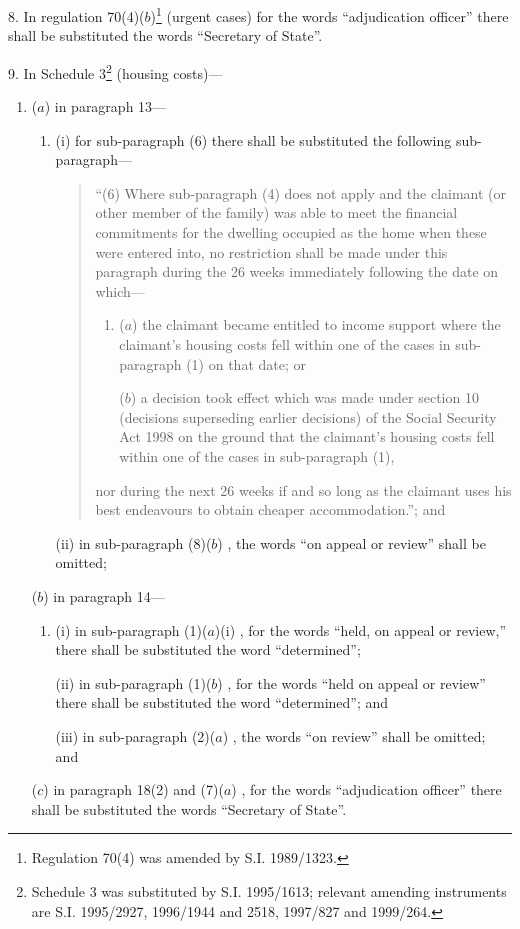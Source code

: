 \documentclass[12pt,a4paper]{article}
\begin{document}
\medskip

8.  In regulation 70(4)($b$)\footnote{\frenchspacing Regulation 70(4) was amended by S.I. 1989/1323.} (urgent cases) for the words “adjudication officer” there shall be substituted the words “Secretary of State”.

\medskip

9.  In Schedule 3\footnote{\frenchspacing Schedule 3 was substituted by S.I. 1995/1613; relevant amending instruments are S.I. 1995/2927, 1996/1944 and 2518, 1997/827 and 1999/264.} (housing costs)---
\begin{enumerate}\item[]
($a$) in paragraph 13---
\begin{enumerate}\item[]
(i) for sub-paragraph (6) there shall be substituted the following sub-paragraph---
\begin{quotation}
“(6) Where sub-paragraph (4) does not apply and the claimant (or other member of the family) was able to meet the financial commitments for the dwelling occupied as the home when these were entered into, no restriction shall be made under this paragraph during the 26 weeks immediately following the date on which---
\begin{enumerate}\item[]
($a$) the claimant became entitled to income support where the claimant’s housing costs fell within one of the cases in sub-paragraph (1) on that date; or

($b$) a decision took effect which was made under section 10 (decisions superseding earlier decisions) of the Social Security Act 1998 on the ground that the claimant’s housing costs fell within one of the cases in sub-paragraph (1),
\end{enumerate}
nor during the next 26 weeks if and so long as the claimant uses his best endeavours to obtain cheaper accommodation.”; and
\end{quotation}

(ii) in sub-paragraph (8)($b$) , the words “on appeal or review” shall be omitted;
\end{enumerate}

($b$) in paragraph 14---
\begin{enumerate}\item[]
(i) in sub-paragraph (1)($a$)(i) , for the words “held, on appeal or review,” there shall be substituted the word “determined”;

(ii) in sub-paragraph (1)($b$) , for the words “held on appeal or review” there shall be substituted the word “determined”; and

(iii) in sub-paragraph (2)($a$) , the words “on review” shall be omitted; and
\end{enumerate}

($c$) in paragraph 18(2) and (7)($a$) , for the words “adjudication officer” there shall be substituted the words “Secretary of State”.
\end{enumerate}
\end{document}
